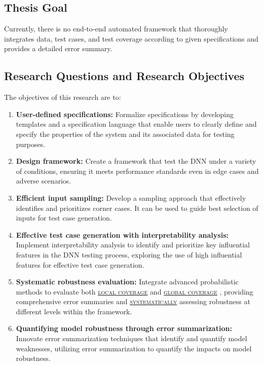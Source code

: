 \subsection{Thesis Goal}
Currently, there is no end-to-end automated framework that thoroughly integrates data, test cases, and test coverage according to given specifications and provides a detailed error summary.

\subsection{Research Questions and Research Objectives}

The objectives of this research are to:

\begin{enumerate}
    \item \textbf{ User-defined specifications:} Formalize specifications by developing templates and a specification language that enable users to clearly define and specify the properties of the system and its associated data for testing purposes.
    \item \textbf{Design framework:} Create a framework that test the DNN under a variety of conditions, ensuring it meets performance standards even in edge cases and adverse scenarios.
    
    \item \textbf{Efficient input sampling:} Develop a sampling approach that effectively identifies and prioritizes corner cases. It can be used to guide best selection of inputs for test case generation.
  
    \item \textbf{Effective test case generation with interpretability analysis:} Implement interpretability analysis to identify and prioritize key influential features in the DNN testing process, exploring the use of high influential features for effective test case generation.
    
    \item \textbf{Systematic robustness evaluation:} Integrate advanced probabilistic methods to evaluate both \hyperref[gloss]{\textsc{\textsc{local coverage}}} \label{Local coverage}  and \hyperref[gloss]{\textsc{\textsc{global coverage}}} \label{Global coverage}, providing comprehensive error summaries and \hyperref[gloss]{\textsc{systematically}} \label{systematic}  assessing robustness at different levels within the framework.
    
    \item \textbf{Quantifying model robustness through error summarization:} Innovate error summarization techniques that identify and quantify model weaknesses, utilizing error summarization to quantify the impacts on model robustness.
\end{enumerate}

